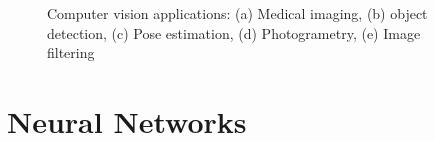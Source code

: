 \begin{figure}[ht!]
    \centering  
    \caption{Computer vision applications: (a) Medical imaging, (b) object detection, (c) Pose estimation, (d) Photogrametry, (e) Image filtering}
    \label{c3:cv_apps}
\end{figure}

\section{Neural Networks}

